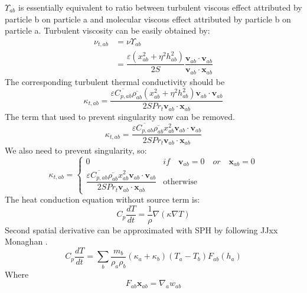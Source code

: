 \documentclass[journal abbreviation, manuscript]{copernicus}
\begin{document}
$\Upsilon_{ab}$ is essentially equivalent to ratio between turbulent viscous effect attributed by particle b on particle a and molecular viscous effect attributed by particle b on particle a. Turbulent viscosity can be easily obtained by:
\begin{equation}
\begin{split}
\nu_{t,ab} &= \nu \Upsilon_{ab} \\
&= \dfrac{\varepsilon (x_{ab}^2 + \eta^2 h_{ab}^2)}{2 S} \dfrac{\textbf{v}_{ab} \cdot \textbf{v}_{ab}}{\textbf{v}_{ab} \cdot \textbf{x}_{ab}}
\end{split}
\end{equation}
The corresponding turbulent thermal conductivity should be
\begin{equation}
\kappa_{t,ab}=\dfrac{\varepsilon \overline{C_{p,ab}} \overline{\rho_{ab}} (x_{ab}^2 + \eta^2 h_{ab}^2) \textbf{v}_{ab} \cdot \textbf{v}_{ab}}{2 S Pr_t\textbf{v}_{ab} \cdot \textbf{x}_{ab}}
\end{equation}
The term that used to prevent singularity now can be removed. 
\begin{equation}
\kappa_{t,ab}=\dfrac{\varepsilon \overline{C_{p,ab}} \overline{\rho_{ab}} x_{ab}^2 \textbf{v}_{ab} \cdot \textbf{v}_{ab}}{2 S Pr_t\textbf{v}_{ab} \cdot \textbf{x}_{ab} }
\end{equation}
We also need to prevent singularity, so: 
\begin{equation}
\kappa_{t,ab}= 
\begin{cases} 
      0 & if  \quad \textbf{v}_{ab}=0 \quad or \quad \textbf{x}_{ab}=0 \\
      \dfrac{\varepsilon \overline{C_{p,ab}} \overline{\rho_{ab}} x_{ab}^2 \textbf{v}_{ab} \cdot \textbf{v}_{ab}}{2 S Pr_t\textbf{v}_{ab} \cdot \textbf{x}_{ab} } & \text{otherwise}
\end{cases}
\label{eq:SPH-LANS-heat-conductivity}
\end{equation}
The heat conduction equation without source term is:
\begin{equation}
C_p \dfrac{dT}{dt} = \dfrac{1}{\rho} \nabla (\kappa \nabla T)
\end{equation}
Second spatial derivative can be approximated with SPH by following JJxx Monaghan \citet{monaghan2005smoothed}. 
\begin{equation}
C_p \dfrac{dT}{dt} = \sum_b \dfrac{m_b}{\rho_a \rho_b} (\kappa_a + \kappa_b) (T_a - T_b) F_{ab} (h_a)
\end{equation}
Where
\begin{equation}
F_{ab} \textbf{x}_{ab} = \nabla _a w_{ab}
\end{equation}
\end{document}
